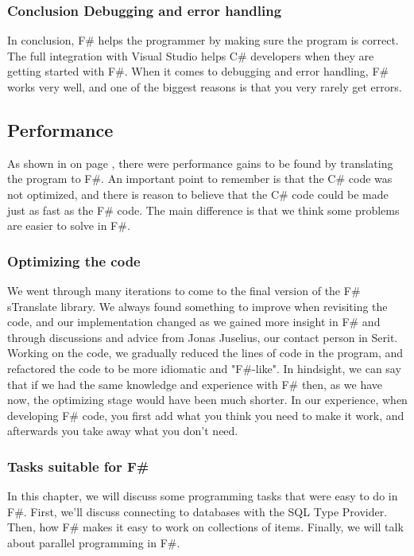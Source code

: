 \documentclass[12pt, a4paper]{article}
\begin{document}
\subsubsection{Conclusion Debugging and error handling}
In conclusion, F\# helps the programmer by making sure the program is correct. The full integration with Visual Studio helps C\# developers when they are getting started with F\#. When it comes to debugging and error handling, F\# works very well, and one of the biggest reasons is that you very rarely get errors.

\newpage

\subsection{Performance}
\label{AnalysisPerformance}
As shown in  on page \pageref{sTranslatePerformance}, there were performance gains to be found by translating the program to F\#. An important point to remember is that the C\# code was not optimized, and there is reason to believe that the C\# code could be made just as fast as the F\# code. The main difference is that we think some problems are easier to solve in F\#.

\subsubsection{Optimizing the code}
We went through many iterations to come to the final version of the F\# sTranslate library. We always found something to improve when revisiting the code, and our implementation changed as we gained more insight in F\# and through discussions and advice from Jonas Juselius, our contact person in Serit. Working on the code, we gradually reduced the lines of code in the program, and refactored the code to be more idiomatic and "F\#-like". In hindsight, we can say that if we had the same knowledge and experience with F\# then, as we have now, the optimizing stage would have been much shorter. In our experience, when developing F\# code, you first add what you think you need to make it work, and afterwards you take away what you don't need.

\subsubsection{Tasks suitable for F\#}
In this chapter, we will discuss some programming tasks that were easy to do in F\#. First, we'll discuss connecting to databases with the SQL Type Provider. Then, how F\# makes it easy to work on collections of items. Finally, we will talk about parallel programming in F\#.
\end{document}

